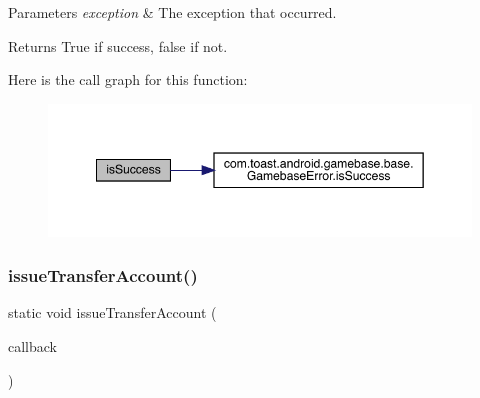 \begin{DoxyParams}{Parameters}
{\em exception} & The exception that occurred. \\
\hline
\end{DoxyParams}
\begin{DoxyReturn}{Returns}
True if success, false if not. 
\end{DoxyReturn}
Here is the call graph for this function\+:
\nopagebreak
\begin{figure}[H]
\begin{center}
\leavevmode
\includegraphics[width=349pt]{classcom_1_1toast_1_1android_1_1gamebase_1_1_gamebase_ae28caa0bc9c72de9cc018ee36eb25b47_cgraph}
\end{center}
\end{figure}
\mbox{\label{classcom_1_1toast_1_1android_1_1gamebase_1_1_gamebase_a8b4208c1f02a43176a621de920d922a0}} 
\subsubsection{\texorpdfstring{issue\+Transfer\+Account()}{issueTransferAccount()}}
{\footnotesize\ttfamily static void issue\+Transfer\+Account (\begin{DoxyParamCaption}\item[{final \hyperlink{interfacecom_1_1toast_1_1android_1_1gamebase_1_1_gamebase_data_callback}{Gamebase\+Data\+Callback}$<$ \hyperlink{classcom_1_1toast_1_1android_1_1gamebase_1_1auth_1_1transfer_1_1data_1_1_transfer_account_info}{Transfer\+Account\+Info} $>$}]{callback }\end{DoxyParamCaption})\hspace{0.3cm}{\ttfamily [static]}}



